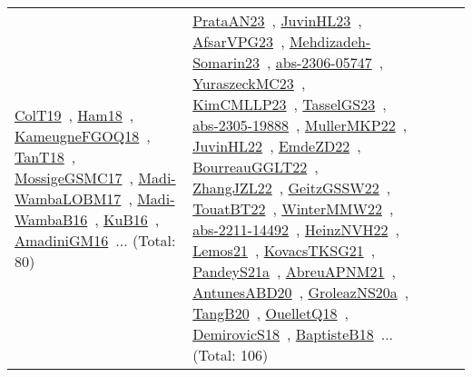 {\begin{longtable}{lp{3cm}>{\raggedright\arraybackslash}p{6cm}>{\raggedright\arraybackslash}p{6cm}>{\raggedright\arraybackslash}p{8cm}}
\href{../works/ColT19.pdf}{ColT19}~\cite{ColT19}, \href{../works/Ham18.pdf}{Ham18}~\cite{Ham18}, \href{../works/KameugneFGOQ18.pdf}{KameugneFGOQ18}~\cite{KameugneFGOQ18}, \href{../works/TanT18.pdf}{TanT18}~\cite{TanT18}, \href{../works/MossigeGSMC17.pdf}{MossigeGSMC17}~\cite{MossigeGSMC17}, \href{../works/Madi-WambaLOBM17.pdf}{Madi-WambaLOBM17}~\cite{Madi-WambaLOBM17}, \href{../works/Madi-WambaB16.pdf}{Madi-WambaB16}~\cite{Madi-WambaB16}, \href{../works/KuB16.pdf}{KuB16}~\cite{KuB16}, \href{../works/AmadiniGM16.pdf}{AmadiniGM16}~\cite{AmadiniGM16}... (Total: 80) & \href{../works/PrataAN23.pdf}{PrataAN23}~\cite{PrataAN23}, \href{../works/JuvinHL23.pdf}{JuvinHL23}~\cite{JuvinHL23}, \href{../works/AfsarVPG23.pdf}{AfsarVPG23}~\cite{AfsarVPG23}, \href{../works/Mehdizadeh-Somarin23.pdf}{Mehdizadeh-Somarin23}~\cite{Mehdizadeh-Somarin23}, \href{../works/abs-2306-05747.pdf}{abs-2306-05747}~\cite{abs-2306-05747}, \href{../works/YuraszeckMC23.pdf}{YuraszeckMC23}~\cite{YuraszeckMC23}, \href{../works/KimCMLLP23.pdf}{KimCMLLP23}~\cite{KimCMLLP23}, \href{../works/TasselGS23.pdf}{TasselGS23}~\cite{TasselGS23}, \href{../works/abs-2305-19888.pdf}{abs-2305-19888}~\cite{abs-2305-19888}, \href{../works/MullerMKP22.pdf}{MullerMKP22}~\cite{MullerMKP22}, \href{../works/JuvinHL22.pdf}{JuvinHL22}~\cite{JuvinHL22}, \href{../works/EmdeZD22.pdf}{EmdeZD22}~\cite{EmdeZD22}, \href{../works/BourreauGGLT22.pdf}{BourreauGGLT22}~\cite{BourreauGGLT22}, \href{../works/ZhangJZL22.pdf}{ZhangJZL22}~\cite{ZhangJZL22}, \href{../works/GeitzGSSW22.pdf}{GeitzGSSW22}~\cite{GeitzGSSW22}, \href{../works/TouatBT22.pdf}{TouatBT22}~\cite{TouatBT22}, \href{../works/WinterMMW22.pdf}{WinterMMW22}~\cite{WinterMMW22}, \href{../works/abs-2211-14492.pdf}{abs-2211-14492}~\cite{abs-2211-14492}, \href{../works/HeinzNVH22.pdf}{HeinzNVH22}~\cite{HeinzNVH22}, \href{../works/Lemos21.pdf}{Lemos21}~\cite{Lemos21}, \href{../works/KovacsTKSG21.pdf}{KovacsTKSG21}~\cite{KovacsTKSG21}, \href{../works/PandeyS21a.pdf}{PandeyS21a}~\cite{PandeyS21a}, \href{../works/AbreuAPNM21.pdf}{AbreuAPNM21}~\cite{AbreuAPNM21}, \href{../works/AntunesABD20.pdf}{AntunesABD20}~\cite{AntunesABD20}, \href{../works/GroleazNS20a.pdf}{GroleazNS20a}~\cite{GroleazNS20a}, \href{../works/TangB20.pdf}{TangB20}~\cite{TangB20}, \href{../works/OuelletQ18.pdf}{OuelletQ18}~\cite{OuelletQ18}, \href{../works/DemirovicS18.pdf}{DemirovicS18}~\cite{DemirovicS18}, \href{../works/BaptisteB18.pdf}{BaptisteB18}~\cite{BaptisteB18}... (Total: 106)\\

\end{longtable}}
